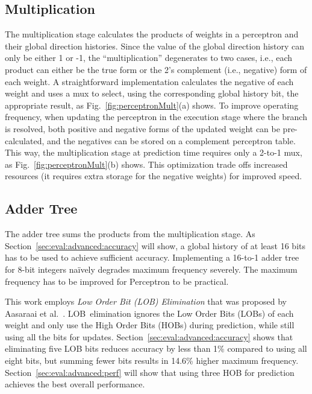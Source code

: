 \subsection{Multiplication}
\label{sec:advanced:perceptron:mult}
The multiplication stage calculates the products of weights in a perceptron and their global direction histories. Since the value of the global direction history can only be either 1 or -1, the ``multiplication'' degenerates to two cases, i.e., each product can either be the true form or the 2's complement (i.e., negative) form of each weight. A straightforward implementation calculates the negative of each weight and uses a mux to select, using the corresponding global history bit, the appropriate result, as Fig.~\ref{fig:perceptronMult}(a) shows. To improve operating frequency, when updating the perceptron in the execution stage where the branch is resolved, both positive and negative forms of the updated weight can be pre-calculated, and the negatives can be stored on a complement perceptron table. This way, the multiplication stage at prediction time requires only a 2-to-1 mux, as Fig.~\ref{fig:perceptronMult}(b) shows. This optimization trade offs increased resources (it requires extra storage for the negative weights) for improved speed.

\subsection{Adder Tree}
\label{sec:advanced:perceptron:adder}
The adder tree sums the products from the multiplication stage. As Section~\ref{sec:eval:advanced:accuracy} will show, a global history of at least 16 bits has to be used to achieve sufficient accuracy. Implementing a 16-to-1 adder tree for 8-bit integers na\"ively degrades maximum frequency severely. The maximum frequency has to be improved for Perceptron to be practical.

This work employs \textit{Low Order Bit (LOB) Elimination} that was proposed by Aasaraai et al.~\cite{lob}. LOB\ elimination ignores the Low Order Bits (LOBs) of each weight and only use the High Order Bits (HOBs) during prediction, while still using all the bits for updates. Section~\ref{sec:eval:advanced:accuracy} shows that eliminating five LOB bits reduces accuracy by less than 1\% compared to using all eight bits, but summing fewer bits results in 14.6\% higher maximum frequency. Section~\ref{sec:eval:advanced:perf} will show that using three HOB for prediction achieves the best overall performance.

